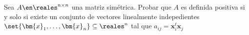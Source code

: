 \def\triangularInferior{
  \begin{tikzpicture}[baseline=-6, scale = 0.5]
    \draw[blue, thin, fill=blue!20,yshift = -6, xshift = -8] (-1,1) -- (-1,-0.7) -- (1.7,-0.7) -- cycle;
    \node at (0,0) {
      $
        \matriz{cc}{
          \quad &  0 \\
          a_{\green{i}\blue{j}} &
        }
      $
    };
  \end{tikzpicture}
}

\begin{enunciado}{\ejercicio}
  Sea $A \en \reales^{n \times n}$ una matriz simétrica.
  Probar que $A$ es definida positiva si y solo si existe un conjunto
  de vectores linealmente indepedientes
  $\set{\bm{x}_1, \ldots, \bm{x}_n} \subseteq \reales^n $
  tal que $a_{ij} = \bm{x}_i^t \bm{x}_j$
\end{enunciado}

